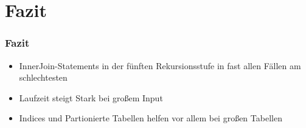 \documentclass[hyperref={pdfpagelabels=false}]{beamer}
\begin{document}
\section{Fazit}
\begin{frame}
\frametitle{Fazit}
	\begin{itemize}
	\item InnerJoin-Statements in der fünften Rekursionsstufe in fast allen Fällen am schlechtesten
	\item Laufzeit steigt Stark bei großem Input
	\item Indices und Partionierte Tabellen helfen vor allem bei großen Tabellen
\end{itemize}	
\end{frame}
\end{document}
